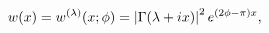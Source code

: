 \[w(x)=w^{(\lambda)}(x;\phi)=\left|\mathop{\Gamma\/}\nolimits\!\left(\lambda+ix%
\right)\right|^{2}e^{(2\phi-\pi)x},\]